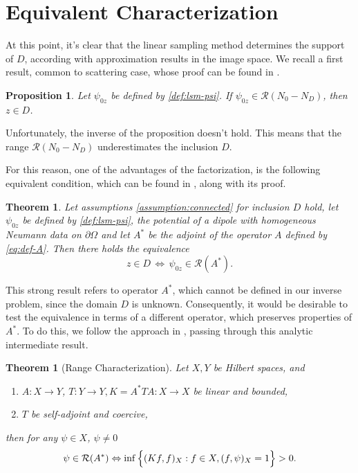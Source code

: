 \documentclass[10pt, a4paper, twoside, openright]{book}
\theoremstyle{definition}
\theoremstyle{plain}
\newtheorem{theorem}[subsection]{Theorem}
\theoremstyle{plain}
\theoremstyle{plain}
\newtheorem{proposition}[subsection]{Proposition}
\theoremstyle{plain}
\theoremstyle{plain}
\theoremstyle{plain}
\theoremstyle{plain}
\theoremstyle{plain}
\begin{document}
\section{Equivalent Characterization}
At this point, it's clear that the linear sampling method determines the support of $D$, according 
with approximation results in the image space. We recall a first result, common to 
scattering case, whose proof can be found in \cite{somersalo:preprint}.
\begin{proposition}
 Let $\psi_{0z}$ be defined by \ref{def:lsm-psi}. If $\psi_{0z}\in\mathcal{R}({N_0}-{N_D})$, then $z\in D$.
\end{proposition}
Unfortunately, the inverse of the proposition doesn't hold. This means that the range $\mathcal{R}({N_0} - {N_D})$ underestimates the inclusion $D$.
\par
For this reason, one of the advantages of the factorization, is the following equivalent condition, which can be found in \cite{kirsch:book}, along with its proof.
\begin{theorem}
\label{theo:equivalence}
 Let assumptions \ref{assumption:connected} for inclusion $D$ hold, let $\psi_{0z}$ 
 be defined by \ref{def:lsm-psi}, the potential of a dipole with homogeneous 
 Neumann data on $\partial \Omega$ and let $A^*$ be the adjoint of the operator $A$ defined by \eqref{eq:def-A}.
 Then there holds the equivalence 
 \begin{equation}
  z \in D \,\Longleftrightarrow \,\psi_{0z} \in \mathcal{R}(A^*).
 \end{equation}
\end{theorem}
This strong result refers to operator $A^*$, which cannot be defined in our inverse problem, since 
the domain $D$ is unknown. Consequently, it would be desirable to test the equivalence in terms of a different operator, which preserves properties of $A^*$. To do this, we follow the approach in \cite{kirsch:book}, passing through this analytic intermediate result.
\begin{theorem}[Range Characterization]
\label{theo:range-characterization}
 Let $X,Y$ be Hilbert spaces, and 
 \begin{enumerate}
  \item $A:X\to Y$, $T:Y\to Y, K=A^*TA:X\to X$ be linear and bounded,
  \item $T$ be self-adjoint and coercive,
 \end{enumerate}
 then for any $\psi \in X$, $\psi\neq 0$
 \begin{equation}
 \psi \in \mathcal{R}(A^*) \Leftrightarrow \inf\Big\{(Kf,f)_X   : f\in X, (f,\psi)_X=1\Big\}>0.\\
 \end{equation}
\end{theorem}
\end{document}
